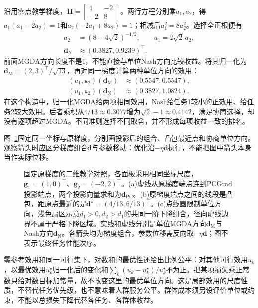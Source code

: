 沿用零点教学梯度，$\bm H=\left[\begin{smallmatrix}1&-2\\-2&8\end{smallmatrix}\right]$。两行方程分别乘$a_1,a_2$，得$a_1(a_1-2a_2)=1$和$a_2(-2a_1+8a_2)=1$；相减后$a_1^2=8a_2^2$。选择全正根便有
\begin{align}
  a_2&=(8-4\sqrt2)^{-1/2},
  \qquad a_1=2\sqrt2\,a_2,
  \nonumber\\
  \bm d_{\mathrm N}&\approx(0.3827,0.9239)^{\top}.
\end{align}
前面MGDA方向长度不是1，不能直接与单位Nash方向比较收益。将其归一化为$\bm d_{\mathrm M}=(2,3)^{\top}/\sqrt{13}$，再对同一梯度计算两种单位方向的效用：
\begin{align}
  (u_1,u_2)(\bm d_{\mathrm M})
    &\approx(0.5547,0.5547),
  \nonumber\\
  (u_1,u_2)(\bm d_{\mathrm N})
    &\approx(0.3827,1.0824).
  \label{eq:ket-sharing-nash-numbers}
\end{align}
在这个构造中，归一化MGDA给两项相同效用，Nash给任务1较小的正效用、给任务2较大效用。后者乘积从$4/13\approx0.3077$增为$\sqrt2-1\approx0.4142$，满足协商选择，却没有逐项超过MGDA。不同准则选择不同取舍，并不形成每项收益一致的排名。

图~\ref{fig:ket-sharing-gradient-geometry}固定同一坐标与原梯度，分别画投影后的组合、凸包最近点和协商单位方向。观察箭头时应区分梯度组合$\bm d$与参数移动：优化沿$-\eta\bm d$执行，不能把图中箭头本身当作实际位移。

\begin{figure}[htbp]
  \centering
  
  \caption{固定原梯度的二维教学对照，各面板采用相同坐标尺度，$\bm g_1=(1,0)^{\top}$、$\bm g_2=(-2,2)^{\top}$。(a)虚线从原梯度端点连到PCGrad投影端点，两个投影向量求和为$\bm d_{\mathrm{PC}}$。(b)原梯度端点之间的线段是凸包，距原点最近的是$\bm d^\star=(4/13,6/13)^{\top}$。(c)点线圆限制单位方向，浅色扇区示意$d_1>0,d_2>d_1$的共同一阶下降组合，径向虚线边界不属于严格下降区域。实线和虚线分别是单位MGDA方向$\bm d_{\mathrm M}$与Nash方向$\bm d_{\mathrm N}$。各箭头均为梯度组合，参数位移需反向取$-\eta\bm d$；图不表示最终任务性能次序。}
  \label{fig:ket-sharing-gradient-geometry}
\end{figure}
\FloatBarrier

零参考效用和同一可行集下，对数和的最优性还给出比例公平：对其他可行效用$u_k$，以最优效用$u_k^\star$归一化后的变化和$\sum_k(u_k-u_k^\star)/u_k^\star$不为正。把某项损失乘正常数只给对数目标加常量，故不改变这里的最优单位方向。这是局部效用的尺度性质，不替代任务优先级，也不意味着人群服务公平。群体成本须另设评价单位或约束，不能以总损失下降代替各任务、各群体收益。

